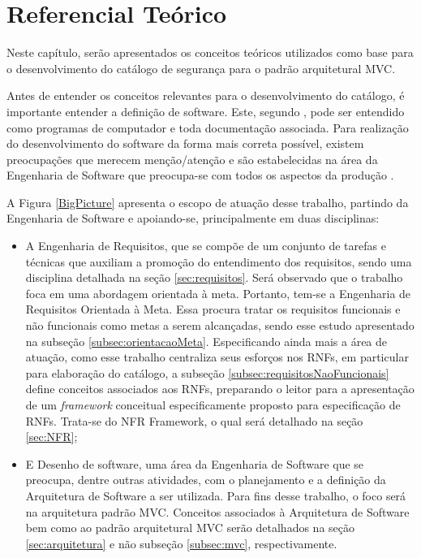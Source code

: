 \chapter[Referencial Teórico]{Referencial Teórico}
\label{chap:referencialTeorico}

Neste capítulo, serão apresentados os conceitos teóricos utilizados como base para o desenvolvimento do catálogo de segurança para o padrão arquitetural MVC.

Antes de entender os conceitos relevantes para o desenvolvimento do catálogo, é importante entender a definição de software. Este, segundo \cite{sommerville2003engenharia}, pode ser entendido como programas de computador e toda documentação associada. Para realização do desenvolvimento do software da forma mais correta possível, existem preocupações que merecem menção/atenção e são estabelecidas na área da Engenharia de Software que preocupa-se com todos os aspectos da produção \cite{sommerville2003engenharia}. 

A Figura \ref{BigPicture} apresenta o escopo de atuação desse trabalho, partindo da Engenharia de Software e apoiando-se, principalmente em duas disciplinas: 

\begin{itemize}
	\item A Engenharia de Requisitos, que se compõe de um conjunto de tarefas e técnicas que auxiliam a promoção do entendimento dos requisitos, sendo uma disciplina detalhada na seção \ref{sec:requisitos}. Será observado que o trabalho foca em uma abordagem orientada à meta. Portanto, tem-se a Engenharia de Requisitos Orientada à Meta. Essa procura tratar os requisitos funcionais e não funcionais como metas a serem alcançadas, sendo esse estudo apresentado na subseção \ref{subsec:orientacaoMeta}. Especificando ainda mais a área de atuação, como esse trabalho centraliza seus esforços nos RNFs, em particular para elaboração do catálogo, a subseção \ref{subsec:requisitosNaoFuncionais} define conceitos associados aos RNFs, preparando o leitor para a apresentação de um \textit{framework} conceitual especificamente proposto para especificação de RNFs. Trata-se do NFR Framework, o qual será detalhado na seção \ref{sec:NFR};
	\item E Desenho de software, uma área da Engenharia de Software que se preocupa, dentre outras atividades, com o planejamento e a definição da Arquitetura de Software a ser utilizada. Para fins desse trabalho, o foco será na arquitetura padrão MVC. Conceitos associados à Arquitetura de Software bem como ao padrão arquitetural MVC serão detalhados na seção \ref{sec:arquitetura} e não subseção \ref{subsec:mvc}, respectivamente.
	
\end{itemize}

